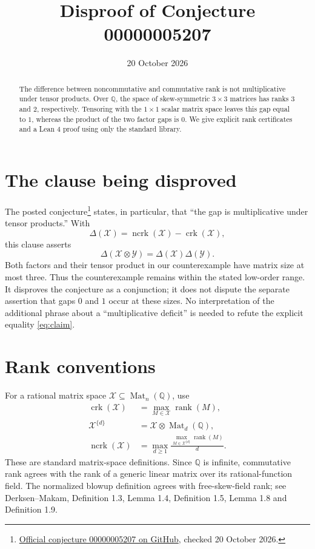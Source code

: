 \documentclass[11pt,letterpaper]{article}
\title{Disproof of Conjecture 00000005207}
\author{}
\date{20 October 2026}
\newcommand{\Q}{\mathbb{Q}}
\newcommand{\crk}{\operatorname{crk}}
\newcommand{\ncrk}{\operatorname{ncrk}}
\newcommand{\Mat}{\operatorname{Mat}}
\begin{document}
\maketitle
\vspace{-1.5em}
\begin{abstract}
The difference between noncommutative and commutative rank is not
multiplicative under tensor products. Over $\Q$, the space of skew-symmetric
$3\times3$ matrices has ranks $3$ and $2$, respectively. Tensoring with the
$1\times1$ scalar matrix space leaves this gap equal to $1$, whereas the
product of the two factor gaps is $0$. We give explicit rank certificates
and a Lean 4 proof using only the standard library.
\end{abstract}

\section{The clause being disproved}
The posted conjecture\footnote{\href{https://github.com/The-Last-Math-Competition/The-Last-Math-Competition/blob/main/conjectures/00000005207.md}{Official conjecture 00000005207 on GitHub}, checked 20 October 2026.}
states, in particular, that ``the gap is multiplicative under tensor
products.'' With
\[
 \Delta(\mathcal X)=\ncrk(\mathcal X)-\crk(\mathcal X),
\]
this clause asserts
\begin{equation}\label{eq:claim}
 \Delta(\mathcal X\otimes\mathcal Y)
 =\Delta(\mathcal X)\Delta(\mathcal Y).
\end{equation}
Both factors and their tensor product in our counterexample have matrix
size at most three. Thus the counterexample remains within the stated
low-order range. It disproves the conjecture as a conjunction; it does
not dispute the separate assertion that gaps $0$ and $1$ occur at these
sizes. No interpretation of the additional phrase about a ``multiplicative
deficit'' is needed to refute the explicit equality \eqref{eq:claim}.

\section{Rank conventions}
For a rational matrix space $\mathcal X\subseteq\Mat_n(\Q)$, use
\begin{align*}
 \crk(\mathcal X)&=\max_{M\in\mathcal X}\operatorname{rank}(M),\\
 \mathcal X^{\{d\}}&=\mathcal X\otimes\Mat_d(\Q),\\
 \ncrk(\mathcal X)&=\max_{d\geq1}
      \frac{\max_{M\in\mathcal X^{\{d\}}}\operatorname{rank}(M)}{d}.
\end{align*}
These are standard matrix-space definitions. Since $\Q$ is infinite,
commutative rank agrees with the rank of a generic linear matrix over
its rational-function field. The normalized blowup definition agrees
with free-skew-field rank; see Derksen--Makam, Definition 1.3,
Lemma 1.4, Definition 1.5, Lemma 1.8 and Definition 1.9\cite{DM}.
\end{document}
